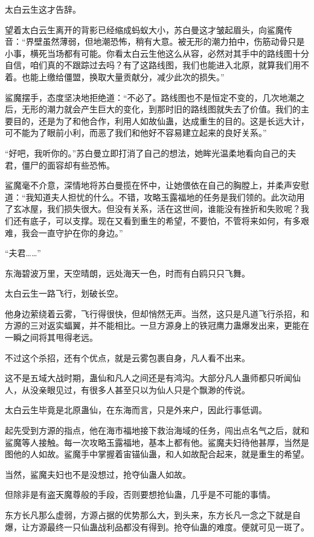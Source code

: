 \begin{this_body}
太白云生这才告辞。

望着太白云生离开的背影已经缩成蚂蚁大小，苏白曼这才皱起眉头，向鲨魔传音：“界壁虽然薄弱，但地潮恐怖，稍有大意。被无形的潮力拍中，伤筋动骨只是小事，横死当场都有可能。你看太白云生他这么从容，必然对其手中的路线图十分自信，咱们真的不跟踪过去吗？有了这路线图，我们也能进入北原，就算我们用不着。也能上缴给僵盟，换取大量贡献分，减少此次的损失。”

鲨魔摆手，态度坚决地拒绝道：“不必了。路线图也不是恒定不变的，几次地潮之后，无形的潮力就会产生巨大的变化，到那时旧的路线图就失去了价值。我们的主要目的，还是为了和他合作，利用人如故仙蛊，达成重生的目的。这是长远大计，可不能为了眼前小利，而恶了我们和他好不容易建立起来的良好关系。”

“好吧，我听你的。”苏白曼立即打消了自己的想法，她眸光温柔地看向自己的夫君，僵尸的面容却有些恐怖。

鲨魔毫不介意，深情地将苏白曼揽在怀中，让她偎依在自己的胸膛上，并柔声安慰道：“我知道夫人担忧的什么。不错，攻略玉露福地的任务是我们领的。此次动用了玄冰屋，我们损失很大。但没有关系，活在这世间，谁能没有挫折和失败呢？我们还有底子，可以支撑。现在又看到重生的希望，不要怕，不管将来如何，有多艰难，我会一直守护在你的身边。”

“夫君……”

东海碧波万里，天空晴朗，远处海天一色，时而有白鸥只只飞舞。

太白云生一路飞行，划破长空。

他身边萦绕着云雾，飞行得很快，但却悄然无声。当然，这只是凡道飞行杀招，和方源的三对返实蝠翼，并不能相比。一旦方源身上的铁冠鹰力蛊爆发出来，更能在一瞬之间将其甩得老远。

不过这个杀招，还有个优点，就是云雾包裹自身，凡人看不出来。

这不是五域大战时期，蛊仙和凡人之间还是有鸿沟。大部分凡人蛊师都只听闻仙人，从没亲眼见过，有很多人甚至只以为仙人只是个飘渺的传说。

太白云生毕竟是北原蛊仙，在东海而言，只是外来户，因此行事低调。

起先受到方源的指点，他在海市福地接下救治海域的任务，闯出点名气之后，就和鲨魔等人接触。每一次攻略玉露福地，基本上都有他。鲨魔夫妇待他甚厚，当然是图他的人如故。鲨魔手中掌握着宙锚仙蛊，和人如故配合起来，就是重生的希望。

当然，鲨魔夫妇也不是没想过，抢夺仙蛊人如故。

但除非是有盗天魔尊般的手段，否则要想抢仙蛊，几乎是不可能的事情。

东方长凡那么虚弱，方源占据的优势那么大，到头来，东方长凡一念之下就是自爆，让方源最终一只仙蛊战利品都没有得到。抢夺仙蛊的难度。便就可见一斑了。


\end{this_body}
